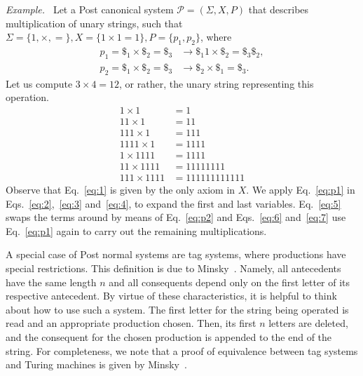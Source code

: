 \documentclass[12pt]{article}
\begin{document}
\emph{Example.~\cite[Problem 12-4.3]{Minsky:book:1967}} Let a Post canonical system $\mathcal{P} = (\Sigma, X, P)$ that describes multiplication of unary strings, such that $\Sigma = \{1, \times, =\}, X = \{1 \times 1 = 1\}, P = \{p_{1}, p_{2}\}$, where 
\begin{align}
    p_{1} = \$_{1} \times \$_{2} = \$_{3} &\rightarrow \$_{1}1 \times \$_{2} = \$_{3}\$_{2}, \label{eq:p1} \\
    p_{2} = \$_{1} \times \$_{2} = \$_{3} &\rightarrow \$_{2} \times \$_{1} = \$_{3}. \label{eq:p2}
\end{align}
Let us compute $3 \times 4 = 12$, or rather, the unary string representing this operation.
\begin{align}
    1    \times 1    &= 1            \label{eq:1} \\
    11   \times 1    &= 11           \label{eq:2} \\
    111  \times 1    &= 111          \label{eq:3} \\
    1111 \times 1    &= 1111         \label{eq:4} \\
    1    \times 1111 &= 1111         \label{eq:5} \\
    11   \times 1111 &= 11111111     \label{eq:6} \\
    111  \times 1111 &= 111111111111 \label{eq:7}
\end{align}
Observe that Eq.~\ref{eq:1} is given by the only axiom in $X$. We apply Eq.~\ref{eq:p1} in Eqs.~\ref{eq:2},~\ref{eq:3} and~\ref{eq:4}, to expand the first and last variables. Eq.~\ref{eq:5} swaps the terms around by means of Eq.~\ref{eq:p2} and Eqs.~\ref{eq:6} and~\ref{eq:7} use Eq.~\ref{eq:p1} again to carry out the remaining multiplications.

A special case of Post normal systems are tag systems, where productions have special restrictions. This definition is due to Minsky~\cite[Sec. 14.6]{Minsky:book:1967}. Namely, all antecedents have the same length $n$ and all consequents depend only on the first letter of its respective antecedent. By virtue of these characteristics, it is helpful to think about how to use such a system. The first letter for the string being operated is read and an appropriate production chosen. Then, its first $n$ letters are deleted, and the consequent for the chosen production is appended to the end of the string. For completeness, we note that a proof of equivalence between tag systems and Turing machines is given by Minsky~\cite[Theorem 14.6-1]{Minsky:book:1967}.
\end{document}

